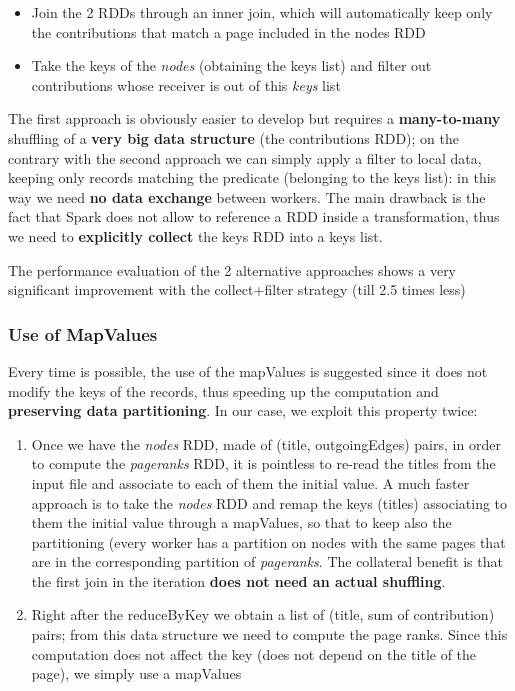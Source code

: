 \begin{itemize}
	\item Join the 2 RDDs through an inner join, which will automatically keep only the contributions that match a page included in the nodes RDD
	\item Take the keys of the \textit{nodes} (obtaining the keys list) and filter out contributions whose receiver is out of this \textit{keys} list
\end{itemize}

The first approach is obviously easier to develop but requires a \textbf{many-to-many} shuffling of a \textbf{very big data structure} (the contributions RDD); on the contrary with the second approach we can simply apply a filter to local data, keeping only records matching the predicate (belonging to the keys list): in this way we need \textbf{no data exchange} between workers. The main drawback is the fact that Spark does not allow to reference a RDD inside a transformation, thus we need to \textbf{explicitly collect} the keys RDD into a keys list.

\noindent The performance evaluation of the 2 alternative approaches shows a very significant improvement with the collect+filter strategy (till 2.5 times less) 

\subsubsection{Use of MapValues}
Every time is possible, the use of the mapValues is suggested since it does not modify the keys of the records, thus speeding up the computation and \textbf{preserving data partitioning}. In our case, we exploit this property twice:

\begin{enumerate}
	\item Once we have the \textit{nodes} RDD, made of (title, outgoingEdges) pairs, in order to compute the \textit{pageranks} RDD, it is pointless to re-read the titles from the input file and associate to each of them the initial value. A much faster approach is to take the \textit{nodes} RDD and remap the keys (titles) associating to them the initial value through a mapValues, so that to keep also the partitioning (every worker has a partition on nodes with the same pages that are in the corresponding partition of \textit{pageranks}. The collateral benefit is that the first join in the iteration \textbf{does not need an actual shuffling}.
	\item Right after the reduceByKey we obtain a list of (title, sum of contribution) pairs; from this data structure we need to compute the page ranks. Since this computation does not affect the key (does not depend on the title of the page), we simply use a mapValues   
\end{enumerate}

